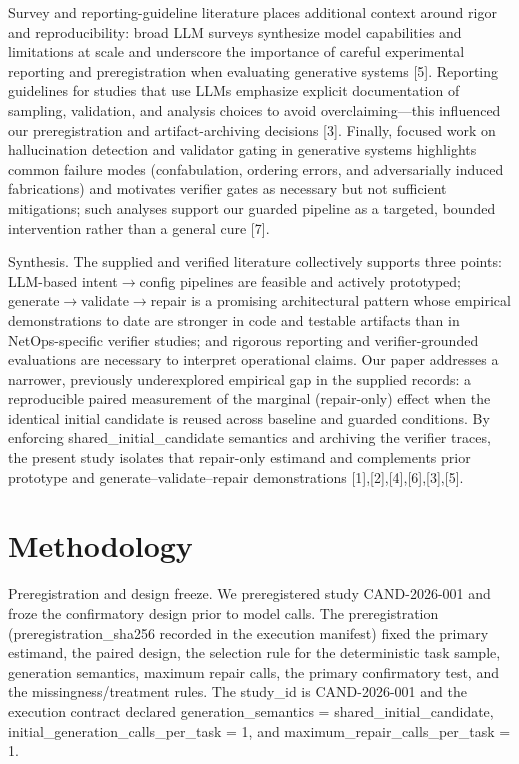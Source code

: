 \documentclass[conference]{IEEEtran}
\begin{document}
Survey and reporting-guideline literature places additional context around rigor and reproducibility: broad LLM surveys synthesize model capabilities and limitations at scale and underscore the importance of careful experimental reporting and preregistration when evaluating generative systems [5]. Reporting guidelines for studies that use LLMs emphasize explicit documentation of sampling, validation, and analysis choices to avoid overclaiming---this influenced our preregistration and artifact-archiving decisions [3]. Finally, focused work on hallucination detection and validator gating in generative systems highlights common failure modes (confabulation, ordering errors, and adversarially induced fabrications) and motivates verifier gates as necessary but not sufficient mitigations; such analyses support our guarded pipeline as a targeted, bounded intervention rather than a general cure [7].

Synthesis. The supplied and verified literature collectively supports three points: LLM-based intent\ensuremath{\rightarrow}config pipelines are feasible and actively prototyped; generate\ensuremath{\rightarrow}validate\ensuremath{\rightarrow}repair is a promising architectural pattern whose empirical demonstrations to date are stronger in code and testable artifacts than in NetOps-specific verifier studies; and rigorous reporting and verifier-grounded evaluations are necessary to interpret operational claims. Our paper addresses a narrower, previously underexplored empirical gap in the supplied records: a reproducible paired measurement of the marginal (repair-only) effect when the identical initial candidate is reused across baseline and guarded conditions. By enforcing shared\_initial\_candidate semantics and archiving the verifier traces, the present study isolates that repair-only estimand and complements prior prototype and generate--validate--repair demonstrations [1],[2],[4],[6],[3],[5].

\section{Methodology}
Preregistration and design freeze. We preregistered study CAND-2026-001 and froze the confirmatory design prior to model calls. The preregistration (preregistration\_sha256 recorded in the execution manifest) fixed the primary estimand, the paired design, the selection rule for the deterministic task sample, generation semantics, maximum repair calls, the primary confirmatory test, and the missingness/treatment rules. The study\_id is CAND-2026-001 and the execution contract declared generation\_semantics = shared\_initial\_candidate, initial\_generation\_calls\_per\_task = 1, and maximum\_repair\_calls\_per\_task = 1.
\end{document}
